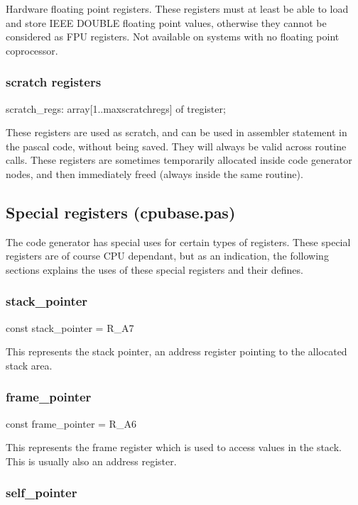 \documentclass [12pt]{article}
\begin{document}
Hardware floating point registers. These registers must at least be able to 
load and store IEEE DOUBLE floating point values, otherwise they cannot be 
considered as FPU registers. Not available on systems with no floating point 
coprocessor.

\subsubsection{scratch registers}
\label{subsubsec:scratch}

\textsf{scratch{\_}regs: array[1..maxscratchregs] of tregister;}

These registers are used as scratch, and can be used in assembler statement 
in the pascal code, without being saved. They will always be valid across 
routine calls. These registers are sometimes temporarily allocated inside 
code generator nodes, and then immediately freed (always inside the same 
routine).

\subsection{Special registers (cpubase.pas)}
\label{subsec:special}

The code generator has special uses for certain types of registers. These 
special registers are of course CPU dependant, but as an indication, the 
following sections explains the uses of these special registers and their 
defines.

\subsubsection{stack{\_}pointer}
\label{subsubsec:stack}

\textsf{const stack{\_}pointer = R{\_}A7}

This represents the stack pointer, an address register pointing to the 
allocated stack area.

\subsubsection{frame{\_}pointer}
\label{subsubsec:frame}

\textsf{const frame{\_}pointer = R{\_}A6}

This represents the frame register which is used to access values in the 
stack. This is usually also an address register.

\subsubsection{self{\_}pointer}
\label{subsubsec:mylabel26}
\end{document}
